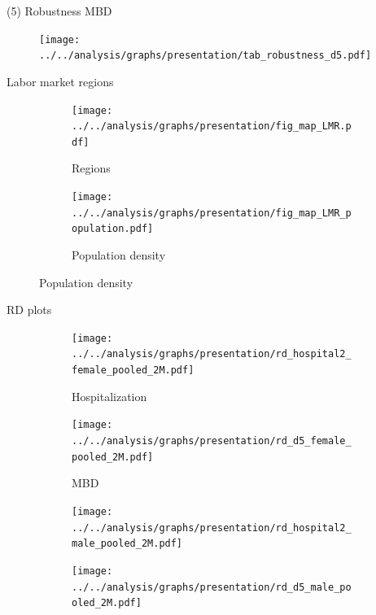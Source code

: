 \documentclass[aspectratio=169,handout]{beamer} %
\begin{document}
\begin{frame}{(5) Robustness MBD}
\begin{figure}
	\texttt{[image: ../../analysis/graphs/presentation/tab\_robustness\_d5.pdf]}
\end{figure}
\hyperlink{ROBUSTNESS}{}
\end{frame}
\begin{frame}{Labor market regions}\label{MAP_LMR}
	\begin{figure}
		\begin{subfigure}{0.32\linewidth}\centering\caption{Regions}
			\texttt{[image: ../../analysis/graphs/presentation/fig\_map\_LMR.pdf]}
		\end{subfigure}
		\begin{subfigure}{0.4\linewidth}\centering\caption{Population density}
			\texttt{[image: ../../analysis/graphs/presentation/fig\_map\_LMR\_population.pdf]}
		\end{subfigure}
	\end{figure}
	\hyperlink{ROBUSTNESS}{}
\end{frame}
\label{RD_PLOTS}
\begin{frame}{RD plots}
	\begin{figure}
		\begin{subfigure}[h]{0.3\linewidth}\centering\caption{Hospitalization}
			\texttt{[image: ../../analysis/graphs/presentation/rd\_hospital2\_female\_pooled\_2M.pdf]}
		\end{subfigure}
		\begin{subfigure}[h]{0.3\linewidth}\centering\caption{MBD}
			\texttt{[image: ../../analysis/graphs/presentation/rd\_d5\_female\_pooled\_2M.pdf]}
		\end{subfigure}

		\begin{subfigure}[h]{0.3\linewidth}\centering
			\texttt{[image: ../../analysis/graphs/presentation/rd\_hospital2\_male\_pooled\_2M.pdf]}
		\end{subfigure}
		\begin{subfigure}[h]{0.3\linewidth}\centering
			\texttt{[image: ../../analysis/graphs/presentation/rd\_d5\_male\_pooled\_2M.pdf]}
		\end{subfigure}
	\end{figure}
	\hyperlink{ROBUSTNESS}{}
\end{frame}
\end{document}
